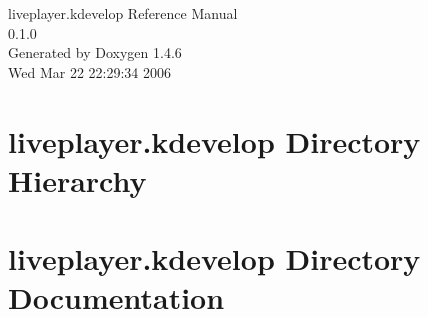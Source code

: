 \documentclass[a4paper]{book}
\begin{document}
\begin{titlepage}
\vspace*{7cm}
\begin{center}
{\Large liveplayer.kdevelop Reference Manual\\[1ex]\large 0.1.0 }\\
\vspace*{1cm}
{\large Generated by Doxygen 1.4.6}\\
\vspace*{0.5cm}
{\small Wed Mar 22 22:29:34 2006}\\
\end{center}
\end{titlepage}
\clearemptydoublepage
{}
\tableofcontents
\clearemptydoublepage
{}
\chapter{liveplayer.kdevelop Directory Hierarchy}

\chapter{liveplayer.kdevelop Directory Documentation}












\printindex
\end{document}
